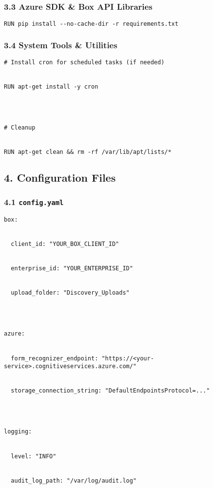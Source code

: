 \documentclass[
]{article}
\begin{document}
\hypertarget{azure-sdk-box-api-libraries}{%
\subsubsection{\texorpdfstring{\textbf{3.3 Azure SDK \& Box API
Libraries}}{3.3 Azure SDK \& Box API Libraries}}\label{azure-sdk-box-api-libraries}}

\texttt{RUN\ pip\ install\ -\/-no-cache-dir\ -r\ req}\texttt{uirements.txt}

\hypertarget{system-tools-utilities}{%
\subsubsection{\texorpdfstring{\textbf{3.4 System Tools \&
Utilities}}{3.4 System Tools \& Utilities}}\label{system-tools-utilities}}

\texttt{\#\ Install\ cron\ for\ scheduled\ tasks\ (if\ needed)}\strut \\
\texttt{RUN\ apt-get\ install\ -y\ cron}\strut \\
\strut \\
\texttt{\#\ Cleanup}\strut \\
\texttt{RUN\ apt-get\ clean\ \&\&\ rm\ -rf\ /var/lib/apt/lists/*}

\hypertarget{configuration-files}{%
\subsection{\texorpdfstring{\textbf{4. Configuration
Files}}{4. Configuration Files}}\label{configuration-files}}

\hypertarget{config.yaml}{%
\subsubsection{\texorpdfstring{\textbf{4.1}
\texttt{config.yaml}}{4.1 config.yaml}}\label{config.yaml}}

\texttt{box:}\strut \\
\texttt{\ \ client\_id:\ "YOUR\_BOX\_CLIENT\_ID}\texttt{"}\strut \\
\texttt{\ \ enterprise\_id:\ "YOUR\_ENTERPRISE\_ID"}\strut \\
\texttt{\ \ upload\_folder:\ "Discovery\_Uploads"}\strut \\
\strut \\
\texttt{azure:}\strut \\
\texttt{\ \ form\_recognizer\_endpoint:\ "https://\textless{}your-service\textgreater{}.cognitiveservices.azure.com/"}\strut \\
\texttt{\ \ storage\_connection\_string:\ "DefaultEndpointsProtocol=..."}\strut \\
\strut \\
\texttt{logging:}\strut \\
\texttt{\ \ level:\ "INFO"}\strut \\
\texttt{\ \ audit\_log\_path:\ "/var/log/audit.log"}
\end{document}
